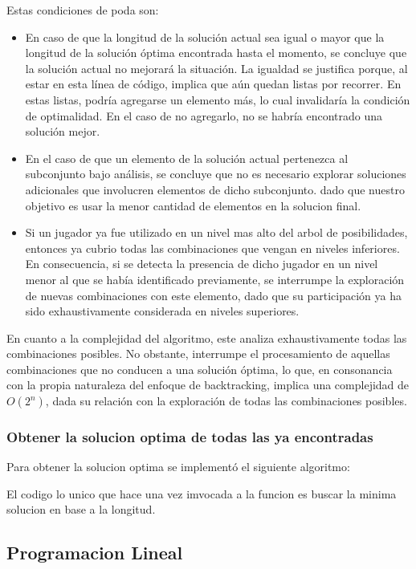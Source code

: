 Estas condiciones de poda son:
\begin{itemize}
	\item En caso de que la longitud de la solución actual sea igual o mayor que la longitud de la solución óptima encontrada hasta el momento, se concluye que la solución actual no mejorará la situación. La igualdad se justifica porque, al estar en esta línea de código, implica que aún quedan listas por recorrer. En estas listas, podría agregarse un elemento más, lo cual invalidaría la condición de optimalidad. En el caso de no agregarlo, no se habría encontrado una solución mejor.
	\item En el caso de que un elemento de la solución actual pertenezca al subconjunto bajo análisis, se concluye que no es necesario explorar soluciones adicionales que involucren elementos de dicho subconjunto. dado que nuestro objetivo es usar la menor cantidad de elementos en la solucion final.
	\item Si un jugador ya fue utilizado en un nivel mas alto del arbol de posibilidades, entonces ya cubrio todas las combinaciones que vengan en niveles inferiores. En consecuencia, si se detecta la presencia de dicho jugador en un nivel menor al que se había identificado previamente, se interrumpe la exploración de nuevas combinaciones con este elemento, dado que su participación ya ha sido exhaustivamente considerada en niveles superiores.
\end{itemize}

En cuanto a la complejidad del algoritmo, este analiza exhaustivamente todas las combinaciones posibles. No obstante, interrumpe el procesamiento de aquellas combinaciones que no conducen a una solución óptima, lo que, en consonancia con la propia naturaleza del enfoque de backtracking, implica una complejidad de ${O}(2^n)$, dada su relación con la exploración de todas las combinaciones posibles. 

\subsubsection{Obtener la solucion optima de todas las ya encontradas}

Para obtener la solucion optima se implementó el siguiente algoritmo:



El codigo lo unico que hace una vez imvocada a la funcion es buscar la minima solucion en base a la longitud.


\subsection{Programacion Lineal}





